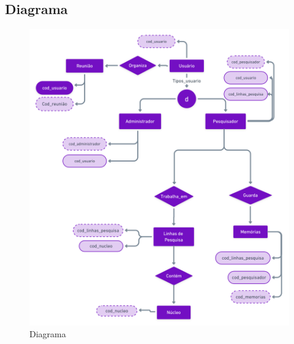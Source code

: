 \documentclass[11pt]{../../classes/ifscarticle}
\begin{document}
\subsection{Diagrama}
\begin{figure}[h]
    \centering
    \includegraphics[width=16cm]{figuras/Diagrama.png}
    \caption{Diagrama}
    \label{fig:logolatex}
\end{figure}
\clearpage



\end{document}
